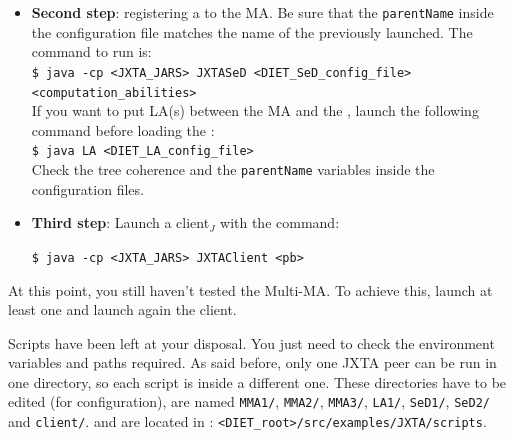 \begin{itemize}
\item{\textbf{Second step}: registering a \sed to the MA. Be sure that the
  \texttt{parentName} inside the configuration file matches the name of the
  \MAdiet previously launched. The command to run is:\\ {\footnotesize
    \texttt{\$ java -cp <JXTA\_JARS> JXTASeD <DIET\_SeD\_config\_file>
      <computation\_abilities>} }\\ If you want to put LA(s) between the MA and
  the \sed, launch the following command before loading the
  \sed:\\ {\footnotesize \texttt{\$ java LA <DIET\_LA\_config\_file>} }\\ Check
  the \diet tree coherence and the \texttt{parentName} variables inside the
  configuration files. }
\item{\textbf{Third step}: Launch a client$_{J}$ with the command:\\
    {\footnotesize
      \texttt{\$ java -cp <JXTA\_JARS> JXTAClient <pb>}

   }
 }

\end{itemize}
  

At this point, you still haven't tested the Multi-MA. To achieve this, launch
at least one \MAj and launch again the client.

Scripts have been left at your disposal. You just need to check the environment
variables and paths required. As said before, only one JXTA peer can be run in
one directory, so each script is inside a different one. These directories have
to be edited (for configuration), are named \texttt{MMA1/}, \texttt{MMA2/},
\texttt{MMA3/}, \texttt{LA1/}, \texttt{SeD1/}, \texttt{SeD2/} and
\texttt{client/}.  and are located in :
\texttt{<DIET\_root>/src/examples/JXTA/scripts}.

